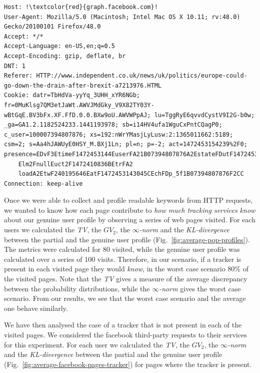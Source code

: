 \begin{lstlisting}[frame=single, breaklines=true, keepspaces=true, basicstyle=\tiny, escapechar=!]
Host: !\textcolor{red}{graph.facebook.com}!
User-Agent: Mozilla/5.0 (Macintosh; Intel Mac OS X 10.11; rv:48.0) Gecko/20100101 Firefox/48.0
Accept: */*
Accept-Language: en-US,en;q=0.5
Accept-Encoding: gzip, deflate, br
DNT: 1
Referer: HTTP://www.independent.co.uk/news/uk/politics/europe-could-go-down-the-drain-after-brexit-a7213976.HTML
Cookie: datr=TbHdVa-yyYq_3UHH_xYR6NGb; fr=0MuKlsg7QM3etJaWt.AWVJMdGky_V9X82TY03Y-wBtGqE.BV3bFx.XF.FfD.0.0.BXw9oU.AWVWPpAJ; lu=TggRyE6qvvdCystV9I2G-b0w; _ga=GA1.2.1182524233.1441193978; sb=i14HV4ufa1WguCxPntCQagP0; c_user=100007394807876; xs=192:nWrYMasjLyLusw:2:1365011662:5189; csm=2; s=Aa4hJAWUyE0HSY_M.BXj1Ln; pl=n; p=-2; act=1472453154239%2F0; presence=EDvF3EtimeF1472453144EuserFA21B07394807876A2EstateFDutF1472453144216Et2F_5b_5d
    Elm2FnullEuct2F1472410836BEtrFA2
    loadA2EtwF240195646EatF1472453143045CEchFDp_5f1B07394807876F2CC
Connection: keep-alive
\end{lstlisting}

Once we were able to collect and profile readable keywords from HTTP requests, we wanted to know how each page contribute to \emph{how much tracking services know} about our genuine user profile by observing a series of web pages visited.
For each users we calculated the \emph{TV}, the \emph{$GV_2$}, the \emph{$\infty$-norm} and the \emph{KL-divergence} between the partial and the genuine user profile (Fig.~\ref{fig:average-pop-profiles}).
The metrics were calculated for 80 visited, while the genuine user profile was calculated over a series of 100 visits. Therefore, in our scenario, if a tracker is present in each visited page they would \emph{know}, in the worst case scenario 80\% of the visited pages.
Note that the \emph{TV} gives a measure of the average discrepancy between the probability distributions, while the \emph{$\infty$-norm} gives the worst case scenario. From our results, we see that the worst case scenario and the average one behave similarly.

We have then analysed the case of a tracker that is not present in each of the visited pages. We considered the facebook third-party requests to their services for this experiment. For each user we calculated the \emph{TV}, the \emph{$GV_2$}, the \emph{$\infty$-norm} and the \emph{KL-divergence} between the partial and the genuine user profile (Fig.~\ref{fig:average-facebook-pages-tracker}) for pages where the tracker is present.

